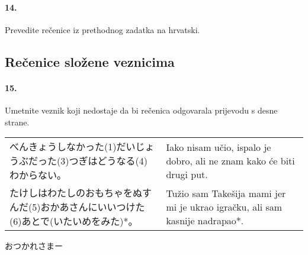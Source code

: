 \documentclass[12pt]{article}
\begin{document}
	\paragraph{14.} Prevedite rečenice iz prethodnog zadatka na hrvatski.
	
	\subsection{Rečenice složene veznicima}
	
	\paragraph{15.} Umetnite veznik koji nedostaje da bi rečenica odgovarala prijevodu s desne strane.
	
	\begin{tabularx}{\textwidth}{X X}
		べんきょうしなかった(1)だいじょうぶだった(3)つぎはどうなる(4)わからない。&Iako nisam učio, ispalo je dobro, ali ne znam kako će biti drugi put.\\
		たけしはわたしのおもちゃをぬすんだ(5)おかあさんにいいつけた(6)あとで(いたいめをみた)*。&Tužio sam Takešija mami jer mi je ukrao igračku, ali sam kasnije nadrapao*.
	\end{tabularx}

\flushright おつかれさまー
\end{document}
